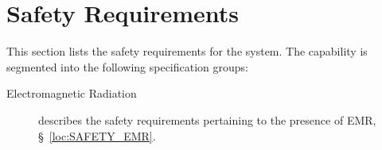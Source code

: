 \KNEADSECTIONNEWPAGE
\section{Safety Requirements}
\label{lab:sec_Safety}
% 

This section lists the safety requirements for the system. The \ThisSys capability is segmented into the following specification groups:

\begin{description}
	\item [Electromagnetic Radiation] describes the safety requirements pertaining to the presence of EMR, \S~\ref{loc:SAFETY_EMR}.
\end{description}


% 

